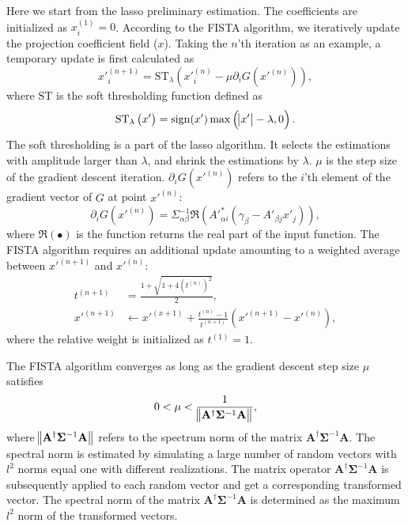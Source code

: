 \documentclass[twocolumn]{aastex62}
\begin{document}
Here we start from the lasso preliminary estimation. The coefficients are
initialized as $x_i^{(1)}=0$. According to the FISTA algorithm, we iteratively
update the projection coefficient field ($x$). Taking the $n$'th iteration as
an example, a temporary update is first calculated as
\begin{equation}
x'^{(n+1)}_{i}=\mathrm{ST}_{\lambda} \left(x'^{(n)}_{i} -\mu \partial_i G(x'^{(n)})\right),
\end{equation}
where $\mathrm{ST}$ is the soft thresholding function defined as
\begin{equation}
\mathrm{ST}_{\lambda} \left(x'\right) = \mathrm{sign} (x') \max \left(\abs{x'}-\lambda,0\right).
\end{equation}
The soft thresholding is a part of the lasso algorithm. It selects the
estimations with amplitude larger than $\lambda$, and shrink the estimations by
$\lambda$.
$\mu$ is the step size of the gradient descent iteration.  $\partial_i
G(x'^{(n)})$ refers to the $i$'th element of the gradient vector of $G$ at
point $x'^{(n)}$:
\begin{equation}
\partial_i G(x'^{(n)})=\Sigma^{-1}_{\alpha\beta}\Re\left(A'^{*}_{\alpha i}(\gamma_{\beta}-A'_{\beta j}x'_{j})\right),
\end{equation}
where $\Re\left( \bullet \right)$ is the function returns the real part of the
input function. The FISTA algorithm requires an additional update amounting to a
weighted average between
$x'^{(n+1)}$ and $x'^{(n)}$:
\begin{equation}
\begin{split}
t^{(n+1)}&=\frac{1+\sqrt{1+4(t^{(n)})^2}}{2},\\
x'^{(n+1)} &\leftarrow x'^{(x+1)}+ \frac{t^{(n)}-1}{t^{(n+1)}}(x'^{(n+1)}-x'^{(n)}),
\end{split}
\end{equation}
where the relative weight is initialized as $t^{(1)}=1$.

The FISTA algorithm converges as long as the gradient descent step size $\mu$
satisfies
\begin{equation}
 0< \mu < \frac{1}{ \norm{\mathbf{A^{\dagger}} \mathbf{\Sigma}^{-1} \mathbf{A} }},
\end{equation}
where $\norm{\mathbf{A^{\dagger}} \mathbf{\Sigma}^{-1} \mathbf{A} }$ refers to
the spectrum norm of the matrix $\mathbf{A^{\dagger}} \mathbf{\Sigma}^{-1}
\mathbf{A}$. The spectral norm is estimated by simulating a large number of
random vectors with $l^2$ norms equal one with different realizations. The
matrix operator $\mathbf{A^{\dagger}} \mathbf{\Sigma}^{-1} \mathbf{A}$ is
subsequently applied to each random vector and get a corresponding transformed
vector. The spectral norm of the matrix $\mathbf{A^{\dagger}}
\mathbf{\Sigma}^{-1} \mathbf{A}$ is determined as the maximum $l^2$ norm of the
transformed vectors.
\end{document}
